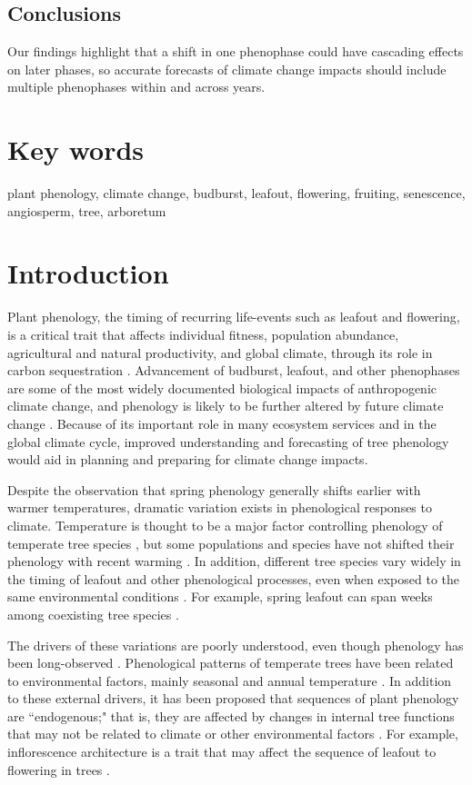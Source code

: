 \documentclass{article}
\begin{document}
\subsection*{Conclusions}
Our findings highlight that a shift in one phenophase could have cascading effects on later phases, so accurate forecasts of climate change impacts should include multiple phenophases within and across years. 

\section* {Key words}
plant phenology, climate change, budburst, leafout, flowering, fruiting, senescence, angiosperm, tree, arboretum
\section* {Introduction}
Plant phenology, the timing of recurring life-events such as leafout and flowering, is a critical trait that affects individual fitness, population abundance, agricultural and natural productivity, and global climate, through its role in carbon sequestration \citep{cleland2007,millerrushing2008,primack2009a,willis2010,miller-rushing2010}. Advancement of budburst, leafout, and other phenophases are some of the most widely documented biological impacts of anthropogenic climate change, and phenology is likely to be further altered by future climate change \citep{parmesan2006}. Because of its important role in many ecosystem services and in the global climate cycle, improved understanding and forecasting of tree phenology would aid in planning and preparing for climate change impacts.
\par Despite the observation that spring phenology generally shifts earlier with warmer temperatures, dramatic variation exists in phenological responses to climate. Temperature is thought to be a major factor controlling phenology of temperate tree species \citep{parmesan2006, morin2010,schwartz2013}, but some populations and species have not shifted their phenology with recent warming \citep{wolkovich2012}. In addition, different tree species vary widely in the timing of leafout and other phenological processes, even when exposed to the same environmental conditions \citep{lechowicz1984,primack2009c}. For example, spring leafout can span weeks among coexisting tree species \citep{lechowicz1984}. 
\par The drivers of these variations are poorly understood, even though phenology has been long-observed \citep{wolkovich2014}. Phenological patterns of temperate trees have been related to environmental factors, mainly seasonal and annual temperature  \citep[e.g.][]{richardson2006,clark2014b}. In addition to these external drivers, it has been proposed that sequences of plant  phenology are  ``endogenous;"  that is, they are affected by changes in internal tree functions that may not be related to climate or other environmental factors \citep{borchert1992,marco2002}. For example, inflorescence architecture  is  a trait that  may affect the sequence of leafout to  flowering in trees \citep{marco2002}. 
\end{document}
